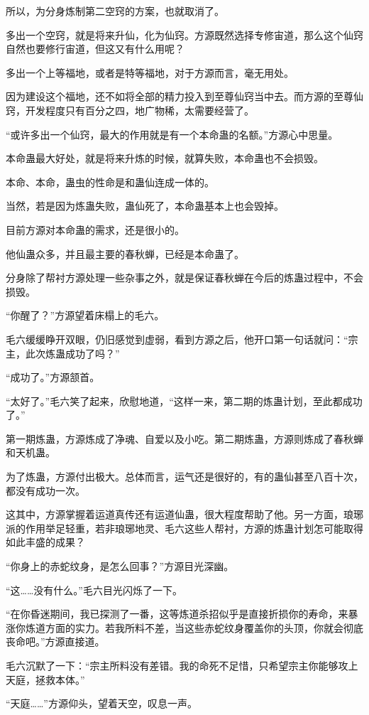 \begin{this_body}
所以，为分身炼制第二空窍的方案，也就取消了。

多出一个空窍，就是将来升仙，化为仙窍。方源既然选择专修宙道，那么这个仙窍自然也要修行宙道，但这又有什么用呢？

多出一个上等福地，或者是特等福地，对于方源而言，毫无用处。

因为建设这个福地，还不如将全部的精力投入到至尊仙窍当中去。而方源的至尊仙窍，开发程度只有百分之四，地广物稀，太需要经营了。

“或许多出一个仙窍，最大的作用就是有一个本命蛊的名额。”方源心中思量。

本命蛊最大好处，就是将来升炼的时候，就算失败，本命蛊也不会损毁。

本命、本命，蛊虫的性命是和蛊仙连成一体的。

当然，若是因为炼蛊失败，蛊仙死了，本命蛊基本上也会毁掉。

目前方源对本命蛊的需求，还是很小的。

他仙蛊众多，并且最主要的春秋蝉，已经是本命蛊了。

分身除了帮衬方源处理一些杂事之外，就是保证春秋蝉在今后的炼蛊过程中，不会损毁。

“你醒了？”方源望着床榻上的毛六。

毛六缓缓睁开双眼，仍旧感觉到虚弱，看到方源之后，他开口第一句话就问：“宗主，此次炼蛊成功了吗？”

“成功了。”方源颔首。

“太好了。”毛六笑了起来，欣慰地道，“这样一来，第二期的炼蛊计划，至此都成功了。”

第一期炼蛊，方源炼成了净魂、自爱以及小吃。第二期炼蛊，方源则炼成了春秋蝉和天机蛊。

为了炼蛊，方源付出极大。总体而言，运气还是很好的，有的蛊仙甚至八百十次，都没有成功一次。

这其中，方源掌握着运道真传还有运道仙蛊，很大程度帮助了他。另一方面，琅琊派的作用举足轻重，若非琅琊地灵、毛六这些人帮衬，方源的炼蛊计划怎可能取得如此丰盛的成果？

“你身上的赤蛇纹身，是怎么回事？”方源目光深幽。

“这……没有什么。”毛六目光闪烁了一下。

“在你昏迷期间，我已探测了一番，这等炼道杀招似乎是直接折损你的寿命，来暴涨你炼道方面的实力。若我所料不差，当这些赤蛇纹身覆盖你的头顶，你就会彻底丧命吧。”方源直接道。

毛六沉默了一下：“宗主所料没有差错。我的命死不足惜，只希望宗主你能够攻上天庭，拯救本体。”

“天庭……”方源仰头，望着天空，叹息一声。


\end{this_body}
